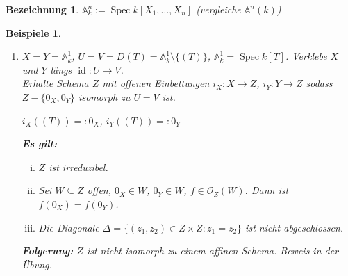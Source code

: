 \documentclass[paper = A4, fontsize=12pt, numbers=noendperiod, chapterprefix=true]{scrbook}
\theoremstyle{break}
\newtheorem{Bez}[Def]{Bezeichnung}
\theoremstyle{nonumberbreak}
\newtheorem{bspe}{Beispiele}
\theoremstyle{nonumberplain}
\DeclareMathOperator{\Spec}{Spec}
\DeclareMathOperator{\id}{id}
\newcommand{\A}{\mathbb{A}}
\newcommand{\calO}{\mathcal{O}}
\begin{document}
\begin{Bez}
$\A_k^n := \Spec k[X_1,\ldots ,X_n]$ (vergleiche $\A^n(k)$)
\end{Bez}

\begin{bspe}\begin{enumerate}[1)]\item[2)]
$X=Y=\A_k^1$, $U=V=D(T) = \A_k^1 \setminus \{(T)\}$, $\A_k^1 = \Spec k[T]$. Verklebe $X$ und $Y$ l\"angs $\id: U\to V$.\\
Erhalte Schema $Z$ mit offenen Einbettungen $i_X: X\to Z$, $i_Y: Y \to Z$ sodass $Z - \{ 0_X, 0_Y\}$ isomorph zu $U=V$ ist.
\begin{center}
$i_X\left((T)\right) =: 0_X$, $i_Y\left((T)\right) =: 0_Y$
\end{center}

\textbf{Es gilt:}\begin{enumerate}[(i)]
\item
	$Z$ ist irreduzibel.
\item
	Sei $W \subseteq Z$ offen, $0_X \in W$, $0_Y \in W$, $f\in \calO_Z(W)$. Dann ist $f(0_X) = f(0_Y)$.
\item
	Die Diagonale $\Delta = \{ (z_1,z_2) \in Z\times Z: z_1 = z_2\}$ ist nicht abgeschlossen.
\end{enumerate}
\textbf{Folgerung:} $Z$ ist nicht isomorph zu einem affinen Schema. Beweis in der \"Ubung.
\end{enumerate}\end{bspe}
\end{document}
